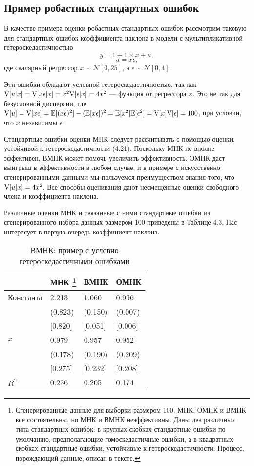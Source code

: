 \subsection{Пример робастных стандартных ошибок}

В качестве примера оценки робастных стандартных ошибок рассмотрим таковую для стандартных ошибок коэффициента наклона в модели с мультипликативной гетероскедастичностью
$$
y = 1 + 1\times x +u,
$$
$$
u = x\epsilon,
$$
где скалярный регрессор $x \sim \mathcal{N} [0, 25]$, а $\epsilon\sim \mathcal{N} [0, 4]$.

Эти ошибки обладают условной гетероскедастичностью, так как $\mathrm{V} [u|x] = \mathrm{V} [x\epsilon | x] = x^2\mathrm{V}[\epsilon|x] = 4x^2$ --- функция от регрессора $x$. Это не так для безусловной дисперсии, где $\mathrm{V}[u] = \mathrm{V}[x\epsilon] = \mathbb{E}[(x\epsilon)^2]-(\mathbb{E}[x\epsilon])^2 = \mathbb{E}[x^2] \mathbb{E}[\epsilon^2] = \mathrm{V}[x] \mathrm{V}[\epsilon] = 100$, при условии, что $x$ независимы $\epsilon$.

Стандартные ошибки оценки МНК следует рассчитывать с помощью оценки, устойчивой к гетероскедастичности (4.21). Поскольку МНК не вполне эффективен, ВМНК может помочь увеличить эффективность. ОМНК даст выигрыш в эффективности в любом случае, и в примере с искусственно сгенерированными данными мы пользуемся преимуществом знания того, что $\mathrm{V} [u|x] = 4x^2$. Все способы оценивания дают несмещённые оценки свободного члена и коэффициента наклона.

Различные оценки МНК и связанные с ними стандартные ошибки из сгенерированного набора данных размером 100 приведены в Таблице 4.3. Нас интересует в первую очередь коэффициент наклона.

\begin{table}[h]
\caption{\label{tab:wls} ВМНК: пример с условно гетероскедастичными ошибками}
\begin{minipage}{\textwidth}
\begin{tabular}[t]{llll}
\hline
\hline
 & \bf{МНК}  \footnote{Сгенерированные данные для выборки размером 100. МНК, ОМНК и ВМНК все состоятельны, но МНК и ВМНК неэффективны. Даны два различных типа стандартных ошибок: в круглых скобках стандартные ошибки по умолчанию, предполагающие гомоскедастичные ошибки, а в квадратных скобках стандартные ошибки, устойчивые к гетероскедастичности. Процесс, порождающий данные, описан в тексте.} & \bf{ВМНК} & \bf{ОМНК}  \\
\hline
    Константа & 2.213 & 1.060  & 0.996 \\
          & (0.823) & (0.150) & (0.007) \\
          & [0.820] & [0.051] & [0.006] \\
    $x$ & 0.979 & 0.957 & 0.952 \\
          & (0.178) & (0.190) & (0.209) \\
          & [0.275] & [0.232] & [0.208] \\
    $R^2$ & 0.236 & 0.205 & 0.174 \\

\hline
\hline
\end{tabular}
\end{minipage}
\end{table}

